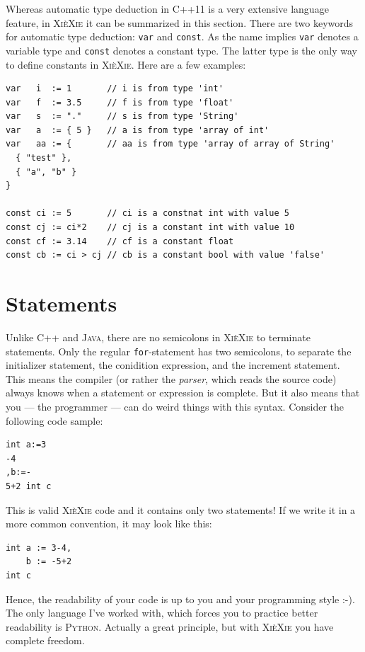\documentclass{report}
\def\xiexie{\textsc{Xi\`eXie}\xspace}
\def\cpp{\textsc{C++}\xspace}
\def\cppx{\textsc{C++11}\xspace}
\def\java{\textsc{Java}\xspace}
\def\python{\textsc{Python}\xspace}
\begin{document}
Whereas automatic type deduction in \cppx is a very extensive language feature,
in \xiexie it can be summarized in this section.
There are two keywords for automatic type deduction: \texttt{var} and \texttt{const}. As the name implies
\texttt{var} denotes a variable type and \texttt{const} denotes a constant type. The latter type is the only way
to define constants in \xiexie. Here are a few examples:
\begin{lstlisting}
var   i  := 1       // i is from type 'int'
var   f  := 3.5     // f is from type 'float'
var   s  := "."     // s is from type 'String'
var   a  := { 5 }   // a is from type 'array of int'
var   aa := {       // aa is from type 'array of array of String'
  { "test" },
  { "a", "b" }
}

const ci := 5       // ci is a constnat int with value 5
const cj := ci*2    // cj is a constant int with value 10
const cf := 3.14    // cf is a constant float
const cb := ci > cj // cb is a constant bool with value 'false'
\end{lstlisting}



\section{Statements}

Unlike \cpp and \java, there are no semicolons in \xiexie to terminate statements.
Only the regular \texttt{for}-statement has two semicolons, to separate the initializer statement,
the conidition expression, and the increment statement. This means the compiler
(or rather the \textit{parser}, which reads the source code) always knows when a statement or expression is complete.
But it also means that you --- the programmer --- can do weird things with this syntax. Consider the following code sample:
\begin{lstlisting}
int a:=3
-4
,b:=-
5+2 int c
\end{lstlisting}
This is valid \xiexie code and it contains only two statements!
If we write it in a more common convention, it may look like this:
\begin{lstlisting}
int a := 3-4,
    b := -5+2
int c
\end{lstlisting}
Hence, the readability of your code is up to you and your programming style :-). The only language I've worked with,
which forces you to practice better readability is \python.
Actually a great principle, but with \xiexie you have complete freedom.
\end{document}
